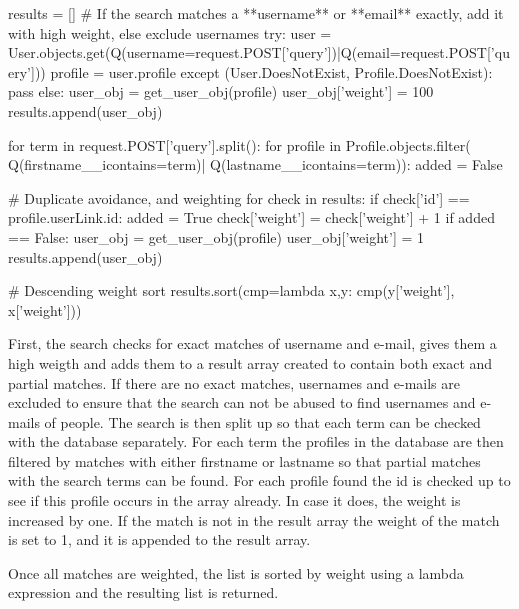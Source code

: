 \begin{snippet}[language=Python,caption=Weighting of the search results]
results = []
# If the search matches a **username** or **email** exactly, add it with high weight, else exclude usernames
try:
	user = User.objects.get(Q(username=request.POST['query'])|Q(email=request.POST['query']))
	profile = user.profile
except (User.DoesNotExist, Profile.DoesNotExist):
	pass
else:
	user_obj = get_user_obj(profile)
	user_obj['weight'] = 100
	results.append(user_obj)

for term in request.POST['query'].split():
	for profile in Profile.objects.filter(
																 Q(firstname__icontains=term)|
																 Q(lastname__icontains=term)):
		added = False
		
		# Duplicate avoidance, and weighting
		for check in results:
			if check['id'] == profile.userLink.id:
				added = True
				check['weight'] = check['weight'] + 1
		if added == False:
			user_obj = get_user_obj(profile)
			user_obj['weight'] = 1
			results.append(user_obj)
					
# Descending weight sort
results.sort(cmp=lambda x,y: cmp(y['weight'], x['weight'])) 
\end{snippet}

First, the search checks for exact matches of username and e-mail, gives them a high weigth and adds them to a result array created to contain both exact and partial matches. If there are no exact matches, usernames and e-mails are excluded to ensure that the search can not be abused to find usernames and e-mails of people.
The search is then split up so that each term can be checked with the database separately. For each term the profiles in the database are then filtered by matches with either firstname or lastname so that partial matches with the search terms can be found. For each profile found the id is checked up to see if this profile occurs in the array already. In case it does, the weight is increased by one. If the match is not in the result array the weight of the match is set to 1, and it is appended to the result array.

Once all matches are weighted, the list is sorted by weight using a lambda expression and the resulting list is returned. 